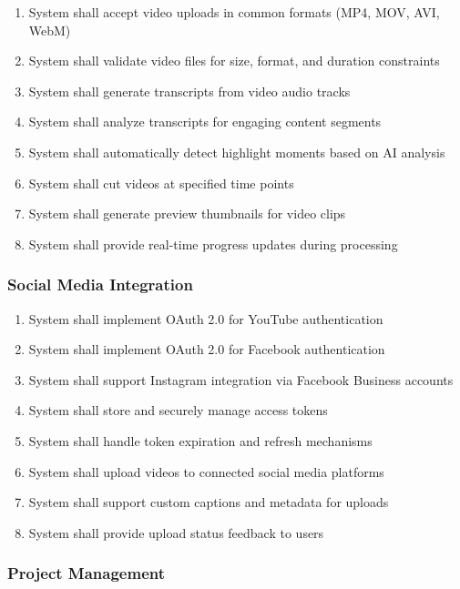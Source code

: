 \begin{enumerate}[label=FR2.\arabic*]
    \item System shall accept video uploads in common formats (MP4, MOV, AVI, WebM)
    \item System shall validate video files for size, format, and duration constraints
    \item System shall generate transcripts from video audio tracks
    \item System shall analyze transcripts for engaging content segments
    \item System shall automatically detect highlight moments based on AI analysis
    \item System shall cut videos at specified time points
    \item System shall generate preview thumbnails for video clips
    \item System shall provide real-time progress updates during processing
\end{enumerate}

\subsubsection{Social Media Integration}

\begin{enumerate}[label=FR3.\arabic*]
    \item System shall implement OAuth 2.0 for YouTube authentication
    \item System shall implement OAuth 2.0 for Facebook authentication
    \item System shall support Instagram integration via Facebook Business accounts
    \item System shall store and securely manage access tokens
    \item System shall handle token expiration and refresh mechanisms
    \item System shall upload videos to connected social media platforms
    \item System shall support custom captions and metadata for uploads
    \item System shall provide upload status feedback to users
\end{enumerate}

\subsubsection{Project Management}

